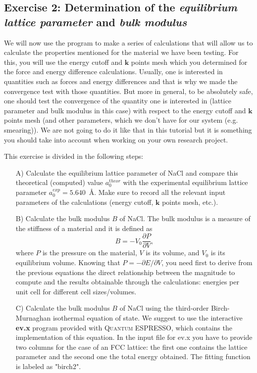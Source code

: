 \documentclass[12pt]{article}
\def\QE{\textsc{Quantum ESPRESSO}\xspace}
\begin{document}
\vspace{6mm}
\subsection{Exercise 2: Determination of the {\it equilibrium lattice parameter}
and {\it bulk modulus}}

We will now use the program to make a series of calculations that will allow us to
calculate the properties mentioned for the material we have been testing.
For this, you will use the energy cutoff and $\mathbf{k}$ points mesh which you determined
for the force and energy difference calculations.
Usually, one is interested in quantities such as forces and energy differences and
that is why we made the convergence test with those quantities.
But more in general, to be absolutely safe, one should test the convergence of the quantity
one is interested in (lattice parameter and bulk modulus in this case) with respect to the
energy cutoff and $\mathbf{k}$ points mesh (and other parameters, which we don't have for
our system (e.g. smearing)).
We are not going to do it like that in this tutorial but it is something you should
take into account when working on your own research project.

This exercise is divided in the following steps:

\begin{itemize}

    \item[A)]
    Calculate the equilibrium lattice parameter of NaCl and compare this theoretical
    (computed) value $a_0^{theor}$ with the experimental equilibrium lattice parameter
    $a_0^{exp} = 5.640$~\AA. Make sure to record all the relevant input parameters
    of the calculations (energy cutoff, $\mathbf{k}$ points mesh, etc.).

    \item[B)]
    Calculate the bulk modulus $B$ of NaCl.
    The bulk modulus is a measure of the stiffness of a material and it is defined
    as $$ B = - V_0 \frac{\partial P}{\partial V}, $$ where $P$ is the pressure on
    the material, $V$ is its volume, and $V_0$ is its equilibrium volume.
    Knowing that $P=-\partial{E}/\partial{V}$, you need first to derive from the previous
    equations the direct relationship between the magnitude to compute and the results
    obtainable through the calculations: energies per unit cell for different cell
    sizes/volumes. 

    \item[C)]
    Calculate the bulk modulus $B$ of NaCl using the third-order Birch-Murnaghan
    isothermal equation of state.
    We suggest to use the interactive {\bf ev.x} program provided with
    \QE, which contains the implementation of this equation.
    In the input file for ev.x you have to provide two columns for the case of an FCC
    lattice: the first one contains the lattice parameter and the second one the total
    energy obtained.
    The fitting function is labeled as "birch2".

\end{itemize}
\vspace{6mm}
\end{document}
